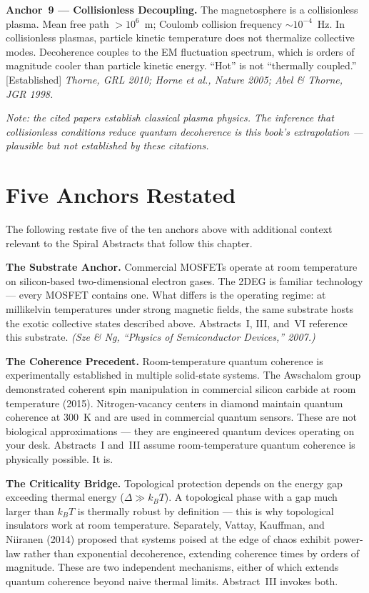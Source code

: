 \textbf{Anchor~9 --- Collisionless Decoupling.} The magnetosphere is a collisionless plasma. Mean free path $>10^6$~m; Coulomb collision frequency $\sim 10^{-4}$~Hz. In collisionless plasmas, particle kinetic temperature does not thermalize collective modes. Decoherence couples to the EM fluctuation spectrum, which is orders of magnitude cooler than particle kinetic energy. ``Hot'' is not ``thermally coupled.'' [Established]
\textit{Thorne, GRL 2010; Horne et al., Nature 2005; Abel \& Thorne, JGR 1998.}

\noindent\textit{Note: the cited papers establish classical plasma physics. The inference that collisionless conditions reduce quantum decoherence is this book's extrapolation --- plausible but not established by these citations.}

\section*{Five Anchors Restated}

The following restate five of the ten anchors above with additional context relevant to the Spiral Abstracts that follow this chapter.

\medskip

\noindent\textbf{The Substrate Anchor.} Commercial MOSFETs operate at room temperature on silicon-based two-dimensional electron gases. The 2DEG is familiar technology --- every MOSFET contains one. What differs is the operating regime: at millikelvin temperatures under strong magnetic fields, the same substrate hosts the exotic collective states described above. Abstracts~I, III, and~VI reference this substrate. \textit{(Sze \& Ng, ``Physics of Semiconductor Devices,'' 2007.)}

\noindent\textbf{The Coherence Precedent.} Room-temperature quantum coherence is experimentally established in multiple solid-state systems. The Awschalom group demonstrated coherent spin manipulation in commercial silicon carbide at room temperature (2015). Nitrogen-vacancy centers in diamond maintain quantum coherence at 300~K and are used in commercial quantum sensors. These are not biological approximations --- they are engineered quantum devices operating on your desk. Abstracts~I and~III assume room-temperature quantum coherence is physically possible. It is.

\noindent\textbf{The Criticality Bridge.} Topological protection depends on the energy gap exceeding thermal energy ($\Delta \gg k_BT$). A topological phase with a gap much larger than $k_BT$ is thermally robust by definition --- this is why topological insulators work at room temperature. Separately, Vattay, Kauffman, and Niiranen (2014) proposed that systems poised at the edge of chaos exhibit power-law rather than exponential decoherence, extending coherence times by orders of magnitude. These are two independent mechanisms, either of which extends quantum coherence beyond naive thermal limits. Abstract~III invokes both.

